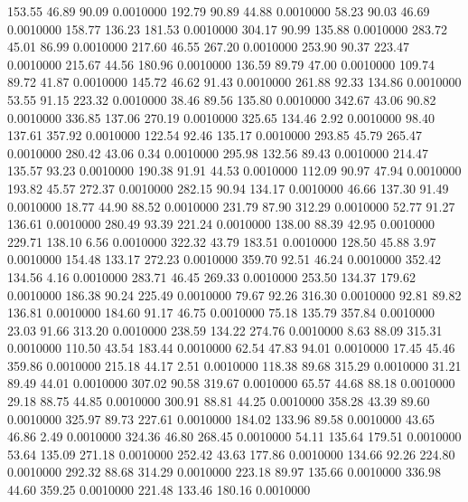  153.55   46.89   90.09   0.0010000
 192.79   90.89   44.88   0.0010000
  58.23   90.03   46.69   0.0010000
 158.77  136.23  181.53   0.0010000
 304.17   90.99  135.88   0.0010000
 283.72   45.01   86.99   0.0010000
 217.60   46.55  267.20   0.0010000
 253.90   90.37  223.47   0.0010000
 215.67   44.56  180.96   0.0010000
 136.59   89.79   47.00   0.0010000
 109.74   89.72   41.87   0.0010000
 145.72   46.62   91.43   0.0010000
 261.88   92.33  134.86   0.0010000
  53.55   91.15  223.32   0.0010000
  38.46   89.56  135.80   0.0010000
 342.67   43.06   90.82   0.0010000
 336.85  137.06  270.19   0.0010000
 325.65  134.46    2.92   0.0010000
  98.40  137.61  357.92   0.0010000
 122.54   92.46  135.17   0.0010000
 293.85   45.79  265.47   0.0010000
 280.42   43.06    0.34   0.0010000
 295.98  132.56   89.43   0.0010000
 214.47  135.57   93.23   0.0010000
 190.38   91.91   44.53   0.0010000
 112.09   90.97   47.94   0.0010000
 193.82   45.57  272.37   0.0010000
 282.15   90.94  134.17   0.0010000
  46.66  137.30   91.49   0.0010000
  18.77   44.90   88.52   0.0010000
 231.79   87.90  312.29   0.0010000
  52.77   91.27  136.61   0.0010000
 280.49   93.39  221.24   0.0010000
 138.00   88.39   42.95   0.0010000
 229.71  138.10    6.56   0.0010000
 322.32   43.79  183.51   0.0010000
 128.50   45.88    3.97   0.0010000
 154.48  133.17  272.23   0.0010000
 359.70   92.51   46.24   0.0010000
 352.42  134.56    4.16   0.0010000
 283.71   46.45  269.33   0.0010000
 253.50  134.37  179.62   0.0010000
 186.38   90.24  225.49   0.0010000
  79.67   92.26  316.30   0.0010000
  92.81   89.82  136.81   0.0010000
 184.60   91.17   46.75   0.0010000
  75.18  135.79  357.84   0.0010000
  23.03   91.66  313.20   0.0010000
 238.59  134.22  274.76   0.0010000
   8.63   88.09  315.31   0.0010000
 110.50   43.54  183.44   0.0010000
  62.54   47.83   94.01   0.0010000
  17.45   45.46  359.86   0.0010000
 215.18   44.17    2.51   0.0010000
 118.38   89.68  315.29   0.0010000
  31.21   89.49   44.01   0.0010000
 307.02   90.58  319.67   0.0010000
  65.57   44.68   88.18   0.0010000
  29.18   88.75   44.85   0.0010000
 300.91   88.81   44.25   0.0010000
 358.28   43.39   89.60   0.0010000
 325.97   89.73  227.61   0.0010000
 184.02  133.96   89.58   0.0010000
  43.65   46.86    2.49   0.0010000
 324.36   46.80  268.45   0.0010000
  54.11  135.64  179.51   0.0010000
  53.64  135.09  271.18   0.0010000
 252.42   43.63  177.86   0.0010000
 134.66   92.26  224.80   0.0010000
 292.32   88.68  314.29   0.0010000
 223.18   89.97  135.66   0.0010000
 336.98   44.60  359.25   0.0010000
 221.48  133.46  180.16   0.0010000

